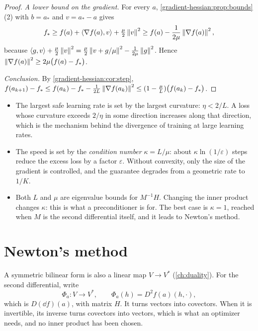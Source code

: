 \begin{notechapter}
\begin{proof}
\emph{A lower bound on the gradient.} For every $a$,
\cref{gradient-hessian:prop:bounds}(2) with $b = a_*$ and $v = a_* - a$
gives
\[
  f_*\geq f(a) + \left\langle \nabla f(a), v \right\rangle + \tfrac\mu2\left\|v\right\|^2
  \geq f(a) - \frac1{2\mu}\left\|\nabla f(a)\right\|^2 ,
\]
because
$\left\langle g, v \right\rangle + \frac\mu2\left\|v\right\|^2
= \frac\mu2\left\|v + g/\mu\right\|^2 - \frac1{2\mu}\left\|g\right\|^2$. Hence
$\left\|\nabla f(a)\right\|^2\geq2\mu\bigl(f(a) - f_*\bigr)$.

\emph{Conclusion.} By \cref{gradient-hessian:cor:step},
$f(a_{k+1}) - f_*\leq f(a_k) - f_* - \frac1{2L}\left\|\nabla f(a_k)\right\|^2
\leq(1 - \frac\mu L)\bigl(f(a_k) - f_*\bigr)$.
\end{proof}

\begin{mlthread}
\begin{itemize}[nosep]
  \item The largest safe learning rate is set by the largest curvature:
        $\eta < 2/L$. A loss whose curvature exceeds $2/\eta$ in some
        direction increases along that direction, which is the mechanism
        behind the divergence of training at large learning rates.
  \item The speed is set by the \emph{condition number} $\kappa = L/\mu$:
        about $\kappa\ln(1/\varepsilon)$ steps reduce the excess loss by
        a factor $\varepsilon$. Without convexity, only the size of the
        gradient is controlled, and the guarantee degrades from a
        geometric rate to $1/K$.
  \item Both $L$ and $\mu$ are eigenvalue bounds for $M^{-1}H$. Changing
        the inner product changes $\kappa$: this is what a preconditioner
        is for. The best case is $\kappa = 1$, reached when $M$ is the
        second differential itself, and it leads to Newton's method.
\end{itemize}
\end{mlthread}

\section{Newton's method}\label{gradient-hessian:sec:newton}

A symmetric bilinear form is also a linear map $V\to V^*$
(\cref{ch:duality}). For the second differential, write
\[
  \Phi_a:V\to V^*, \qquad \Phi_a(h) = D^2f(a)(h, \cdot) ,
\]
which is $D(\dd f)(a)$, with matrix $H$. It turns vectors into covectors.
When it is invertible, its inverse turns covectors into vectors, which is
what an optimizer needs, and no inner product has been chosen.


\end{notechapter}
